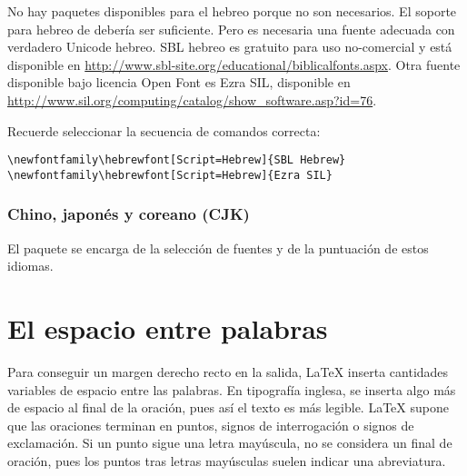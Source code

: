 No hay paquetes disponibles para el hebreo porque no son
necesarios. El soporte para hebreo de  debería ser suficiente. 
Pero es necesaria una fuente adecuada con verdadero Unicode hebreo. SBL hebreo 
es gratuito para uso no-comercial y está disponible en 
\url{http://www.sbl-site.org/educational/biblicalfonts.aspx}. Otra fuente
disponible bajo licencia Open Font es Ezra SIL, disponible en 
\url{http://www.sil.org/computing/catalog/show_software.asp?id=76}.

Recuerde seleccionar la secuencia de comandos correcta:

\begin{lscommand}
\verb|\newfontfamily\hebrewfont[Script=Hebrew]{SBL Hebrew}| \\
\verb|\newfontfamily\hebrewfont[Script=Hebrew]{Ezra SIL}|
\end{lscommand}


\subsubsection{Chino, japonés y coreano (CJK)}

El paquete \cite{xecjk} se encarga de la selección de fuentes y de 
la puntuación de estos idiomas.

\section{El espacio entre palabras}

Para conseguir un margen derecho recto en la salida, \LaTeX{} inserta cantidades variables de espacio entre las palabras.  En tipografía inglesa, se inserta algo más de espacio al final de la oración, pues así el texto es más legible.  \LaTeX{} supone que las oraciones terminan en puntos, signos de interrogación o signos de exclamación. Si un punto sigue una letra mayúscula, no se considera un final de oración, pues los puntos tras letras mayúsculas suelen indicar una abreviatura.

